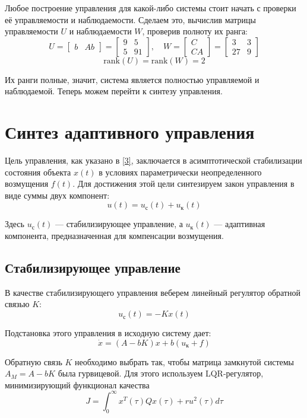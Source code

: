 \documentclass[a4paper,hidelinks,14pt]{extarticle}
\begin{document}
	Любое построение управления для какой-либо системы стоит начать с проверки её управляемости и наблюдаемости. Сделаем это, вычислив матрицы управляемости $U$ и наблюдаемости $W$, проверив полноту их ранга:
	\[
		U = \begin{bmatrix}
			b & Ab
		\end{bmatrix} = \begin{bmatrix}
			9 & 5 \\
			5 & 91
		\end{bmatrix}, \quad W = \begin{bmatrix}
			C \\
			CA
		\end{bmatrix} = \begin{bmatrix}
			3 & 3 \\
			27 & 9
		\end{bmatrix}
	\]
	\[
		\text{rank}(U) = \text{rank}(W) = 2
	\]

	Их ранги полные, значит, система является полностью управляемой и наблюдаемой. Теперь можем перейти к синтезу управления.

	\section{Синтез адаптивного управления}
	Цель управления, как указано в \eqref{3}, заключается в асимптотической стабилизации состояния объекта $x(t)$ в условиях параметрически неопределенного возмущения $f(t)$. Для достижения этой цели синтезируем закон управления в виде суммы двух компонент:
	\begin{equation}
	u(t) = u_{\text{с}}(t) + u_{\text{к}}(t)
	\end{equation}

	Здесь $u_{\text{с}}(t)$ — стабилизирующее управление, а $u_{\text{к}}(t)$ — адаптивная компонента, предназначенная для компенсации возмущения.

	\subsection{Стабилизирующее управление}
	В качестве стабилизирующего управления веберем линейный регулятор обратной связью $K$:
	\begin{equation}
	u_{\text{с}}(t) = -K x(t)
	\end{equation}

	Подстановка этого управления в исходную систему дает:
	\[
	\dot{x} = (A - b K)x + b(u_{\text{к}} + f)
	\]

	Обратную связь $K$ необходимо выбрать так, чтобы матрица замкнутой системы $A_M = A - b K$ была гурвицевой. Для этого используем LQR-регулятор, минимизирующий функционал качества
	\[
		J = \int_0^\infty x^T(\tau) Q x(\tau) + r u^2(\tau) d\tau
	\]
\end{document}
